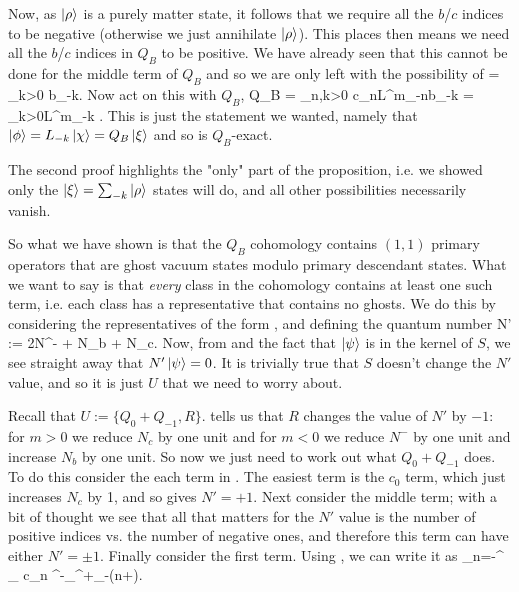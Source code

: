         Now, as $\ket{\rho}$ is a purely matter state, it follows that we require all the $b$/$c$ indices to be negative (otherwise we just annihilate $\ket{\rho}$). This places then means we need all the $b$/$c$ indices in $Q_B$ to be positive. We have already seen that this cannot be done for the middle term of $Q_B$ and so we are only left with the possibility of 
        \bse 
            \ket{\xi} = \sum_{k>0} b_{-k}\ket{\rho}.
        \ese 
        Now act on this with $Q_B$, 
        \bse 
            Q_B\ket{\xi} = \sum_{n,k>0} c_nL^m_{-n}b_{-k} \ket{\rho} = \sum_{k>0}L^m_{-k} \ket{\rho}.
        \ese 
        This is just the statement we wanted, namely that $\ket{\phi} = L_{-k}\ket{\chi} = Q_B\ket{\xi}$ and so is $Q_B$-exact.
    \een 
\eq 

\br 
    The second proof highlights the "only" part of the proposition, i.e. we showed only the $\ket{\xi}=\sum_{-k}\ket{\rho}$ states will do, and all other possibilities necessarily vanish.
\er 

So what we have shown is that the $Q_B$ cohomology contains $(1,1)$ primary operators that are ghost vacuum states modulo primary descendant states. What we want to say is that \textit{every} class in the cohomology contains at least one such term, i.e. each class has a representative that contains no ghosts. We do this by considering the representatives of the form , and defining the quantum number 
\bse 
    N' := 2N^- + N_b + N_c.
\ese 
Now, from  and the fact that $\ket{\psi}$ is in the kernel of $S$, we see straight away that $N'\ket{\psi} = 0$. It is trivially true that $S$ doesn't change the $N'$ value, and so it is just $U$ that we need to worry about. 

Recall that $U := \{Q_0+Q_{-1},R\}$.  tells us that $R$ changes the value of $N'$ by $-1$: for $m>0$ we reduce $N_c$ by one unit and for $m<0$ we reduce $N^-$ by one unit and increase $N_b$ by one unit. So now we just need to work out what $Q_0+Q_{-1}$ does. To do this consider the each term in . The easiest term is the $c_0$ term, which just increases $N_c$ by 1, and so gives $N'=+1$. Next consider the middle term; with a bit of thought we see that all that matters for the $N'$ value is the number of positive indices vs. the number of negative ones, and therefore this term can have either $N'=\pm1$. Finally consider the first term. Using , we can write it as 
\bse 
    \sum_{n=-\infty}^{\infty} \sum_{\ell} c_n \a^-_{\ell}\a^+_{-(n+\ell)}.
\ese

